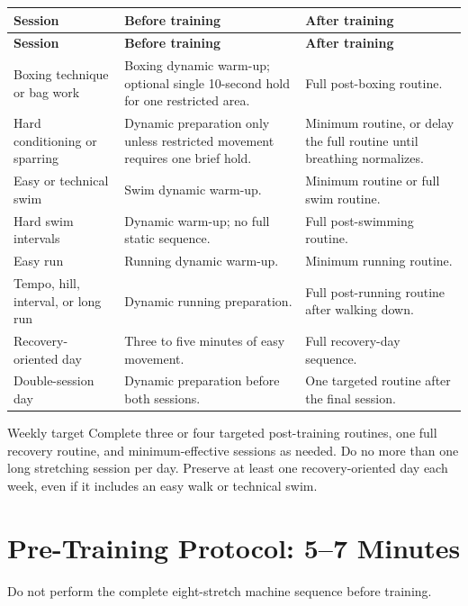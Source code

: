 \documentclass[10pt,letterpaper]{article}
\begin{document}
\begin{longtable}{@{}L{1.38in}L{2.36in}L{3.09in}@{}}
\toprule
{}
\color{white}\textbf{Session} & \color{white}\textbf{Before training} & \color{white}\textbf{After training} \\
\midrule
\endfirsthead
\toprule
{}
\color{white}\textbf{Session} & \color{white}\textbf{Before training} & \color{white}\textbf{After training} \\
\midrule
\endhead
Boxing technique or bag work & Boxing dynamic warm-up; optional single 10-second hold for one restricted area. & Full post-boxing routine. \\
Hard conditioning or sparring & Dynamic preparation only unless restricted movement requires one brief hold. & Minimum routine, or delay the full routine until breathing normalizes. \\
Easy or technical swim & Swim dynamic warm-up. & Minimum routine or full swim routine. \\
Hard swim intervals & Dynamic warm-up; no full static sequence. & Full post-swimming routine. \\
Easy run & Running dynamic warm-up. & Minimum running routine. \\
Tempo, hill, interval, or long run & Dynamic running preparation. & Full post-running routine after walking down. \\
Recovery-oriented day & Three to five minutes of easy movement. & Full recovery-day sequence. \\
Double-session day & Dynamic preparation before both sessions. & One targeted routine after the final session. \\
\bottomrule
\end{longtable}

\begin{callout}{Weekly target}
Complete three or four targeted post-training routines, one full recovery routine, and minimum-effective sessions as needed. Do no more than one long stretching session per day. Preserve at least one recovery-oriented day each week, even if it includes an easy walk or technical swim.
\end{callout}

\Needspace{0.34\textheight}
\section{Pre-Training Protocol: 5--7 Minutes}

Do not perform the complete eight-stretch machine sequence before training.
\end{document}
